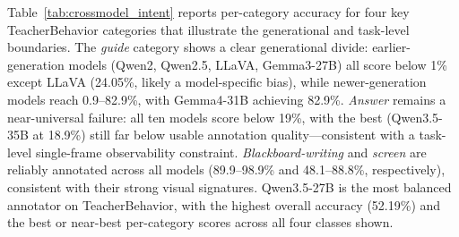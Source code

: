 \documentclass{ieeeaccess}
\begin{document}
\begin{table}[!ht]
\caption{Ten-model cross-model robustness check of validation-set annotation
accuracy under a common bbox-crop and index-only prompting protocol.
Abbreviations: Q2.5-7B = Qwen2.5-VL-7B-Instruct;
G3-27B = Gemma-3-27B-IT (4-bit);
Q3.5-27B = Qwen3.5-27B; Q3.5-35B = Qwen3.5-35B-A3B (MoE);
Q3.6-27B = Qwen3.6-27B; Q3.6-35B = Qwen3.6-35B-A3B (MoE, FP8);
G4-26B = Gemma4-26B-A4B-it (MoE); G4-31B = Gemma4-31B-it.
Qwen2 = Qwen2-VL-7B-Instruct; LLaVA = LLaVA-1.5-7B.
``---'' indicates the model was not evaluated on that dataset.
Values are bbox-level pseudo-label accuracy (\%). Best per dataset in bold.}
\label{tab:crossmodel_overall}
\centering
\scriptsize
{}
\normalsize
\end{table}

Table~\ref{tab:crossmodel_intent} reports per-category accuracy for
four key TeacherBehavior categories that illustrate the generational and
task-level boundaries.
The \textit{guide} category shows a clear generational divide: earlier-generation
models (Qwen2, Qwen2.5, LLaVA, Gemma3-27B) all score below 1\% except LLaVA
(24.05\%, likely a model-specific bias), while newer-generation models reach
0.9--82.9\%, with Gemma4-31B achieving 82.9\%.
\textit{Answer} remains a near-universal failure: all ten models score
below 19\%, with the best (Qwen3.5-35B at 18.9\%) still far below
usable annotation quality---consistent with a task-level single-frame
observability constraint.
\textit{Blackboard-writing} and \textit{screen} are reliably annotated
across all models (89.9--98.9\% and 48.1--88.8\%, respectively),
consistent with their strong visual signatures.
Qwen3.5-27B is the most balanced annotator on TeacherBehavior, with the
highest overall accuracy (52.19\%) and the best or near-best per-category
scores across all four classes shown.
\end{document}
